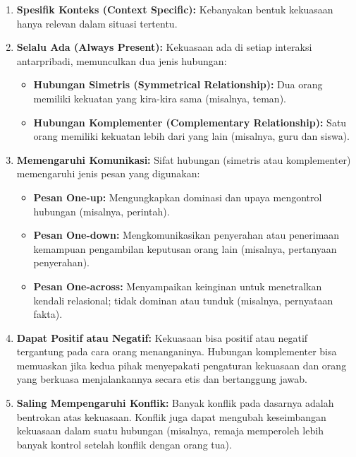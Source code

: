 \documentclass[
  letterpaper,
  DIV=11,
  numbers=noendperiod]{scrreprt}
\providecommand{\tightlist}{%
  \setlength{\itemsep}{0pt}\setlength{\parskip}{0pt}}
\begin{document}
\begin{enumerate}
\def\labelenumi{\arabic{enumi}.}
\tightlist
\item
  \textbf{Spesifik Konteks (Context Specific):} Kebanyakan bentuk
  kekuasaan hanya relevan dalam situasi tertentu.
\item
  \textbf{Selalu Ada (Always Present):} Kekuasaan ada di setiap
  interaksi antarpribadi, memunculkan dua jenis hubungan:

  \begin{itemize}
  \tightlist
  \item
    \textbf{Hubungan Simetris (Symmetrical Relationship):} Dua orang
    memiliki kekuatan yang kira-kira sama (misalnya, teman).
  \item
    \textbf{Hubungan Komplementer (Complementary Relationship):} Satu
    orang memiliki kekuatan lebih dari yang lain (misalnya, guru dan
    siswa).
  \end{itemize}
\item
  \textbf{Memengaruhi Komunikasi:} Sifat hubungan (simetris atau
  komplementer) memengaruhi jenis pesan yang digunakan:

  \begin{itemize}
  \tightlist
  \item
    \textbf{Pesan One-up:} Mengungkapkan dominasi dan upaya mengontrol
    hubungan (misalnya, perintah).
  \item
    \textbf{Pesan One-down:} Mengkomunikasikan penyerahan atau
    penerimaan kemampuan pengambilan keputusan orang lain (misalnya,
    pertanyaan penyerahan).
  \item
    \textbf{Pesan One-across:} Menyampaikan keinginan untuk menetralkan
    kendali relasional; tidak dominan atau tunduk (misalnya, pernyataan
    fakta).
  \end{itemize}
\item
  \textbf{Dapat Positif atau Negatif:} Kekuasaan bisa positif atau
  negatif tergantung pada cara orang menanganinya. Hubungan komplementer
  bisa memuaskan jika kedua pihak menyepakati pengaturan kekuasaan dan
  orang yang berkuasa menjalankannya secara etis dan bertanggung jawab.
\item
  \textbf{Saling Mempengaruhi Konflik:} Banyak konflik pada dasarnya
  adalah bentrokan atas kekuasaan. Konflik juga dapat mengubah
  keseimbangan kekuasaan dalam suatu hubungan (misalnya, remaja
  memperoleh lebih banyak kontrol setelah konflik dengan orang tua).
\end{enumerate}
\end{document}
